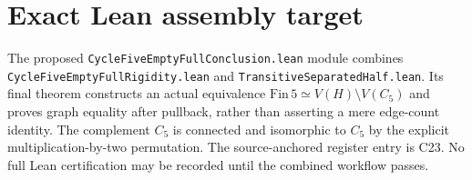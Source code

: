 \documentclass[11pt,a4paper]{article}
\begin{document}
\section*{Exact Lean assembly target}
The proposed \texttt{CycleFiveEmptyFullConclusion.lean}
module combines
\texttt{CycleFiveEmptyFullRigidity.lean} and
\texttt{TransitiveSeparatedHalf.lean}.
Its final theorem constructs an actual equivalence
\(\mathrm{Fin}\,5\simeq V(H)\setminus V(C_5)\) and proves
graph equality after pullback, rather than asserting a
mere edge-count identity. The complement \(C_5\) is
connected and isomorphic to \(C_5\) by the explicit
multiplication-by-two permutation.
The source-anchored register entry is C23.
No full Lean certification may be recorded until
the combined workflow passes.
\end{document}

